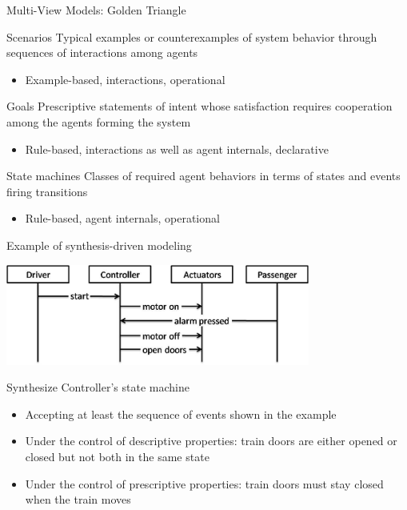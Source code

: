 \documentclass[11pt]{beamer}
\begin{document}
\begin{frame}{Multi-View Models: Golden Triangle} 
    \begin{block}{Scenarios} 
      Typical examples or counterexamples of system behavior through sequences of interactions among agents
      \begin{itemize} \item Example-based, interactions, operational \end{itemize}
    \end{block}
    \begin{block}{Goals} 
      Prescriptive statements of intent whose satisfaction requires cooperation among the agents forming the system
      \begin{itemize} \item Rule-based, interactions as well as agent internals, declarative \end{itemize}
    \end{block}
    \begin{block}{State machines} 
      Classes of required agent behaviors in terms of states and events firing transitions
      \begin{itemize} \item  Rule-based, agent internals, operational \end{itemize}
    \end{block}
\end{frame}

\begin{frame}{Example of synthesis-driven modeling} 
  \begin{center}
    \includegraphics[width=10cm]{images/train_scenario.jpg}
  \end{center}
  \begin{block}{Synthesize Controller's state machine}
    \begin{itemize}
      \item Accepting at least the sequence of events shown in the example
      \item Under the control of descriptive properties: train doors are either opened or closed but not both in the same state
      \item Under the control of prescriptive properties: train doors must stay closed when the train moves
    \end{itemize}
  \end{block}
\end{frame}
\end{document}
